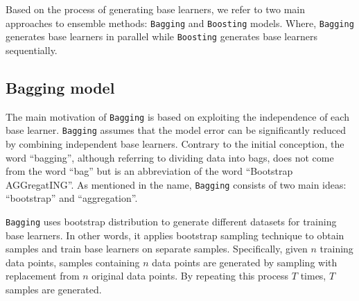 
Based on the process of generating base learners, we refer to two main approaches to ensemble methods: \verb|Bagging| and \verb|Boosting| models. Where, \verb|Bagging| generates base learners in parallel while \verb|Boosting| generates base learners sequentially.

\subsection{Bagging model}


The main motivation of \verb|Bagging| is based on exploiting the independence of each base learner. \verb|Bagging| assumes that the model error can be significantly reduced by combining independent base learners. Contrary to the initial conception, the word ``bagging'', although referring to dividing data into bags, does not come from the word ``bag'' but is an abbreviation of the word ``Bootstrap AGGregatING''. As mentioned in the name, \verb|Bagging| consists of two main ideas: ``bootstrap'' and ``aggregation''.


\verb|Bagging| uses bootstrap distribution to generate different datasets for training base learners. In other words, it applies bootstrap sampling technique to obtain samples and train base learners on separate samples. Specifically, given $n$ training data points, samples containing $n$ data points are generated by sampling with replacement from $n$ original data points. By repeating this process $T$ times, $T$ samples are generated.


